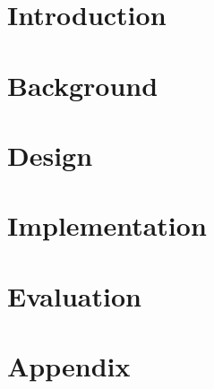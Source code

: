 \documentclass[a4paper,twoside,10pt]{report}
\begin{document}
\newpage


\pagestyle{fancy}
\fancyfoot{}
\fancyfoot[LE,RO]{\thepage}



\chapter{Introduction}


\chapter{Background}


\chapter{Design}


\chapter{Implementation}


\chapter{Evaluation}


\appendix
\chapter{Appendix}


\renewcommand\bibname{References}
\printbibliography{}
\end{document}
